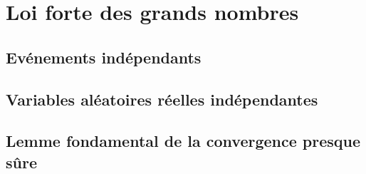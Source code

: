 \chapter{Loi forte des grands nombres}

\label{chapter:loi_forte_des_grands_nombres}

\section{Evénements indépendants}

\section{Variables aléatoires réelles indépendantes}

\section{Lemme fondamental de la convergence presque sûre}
